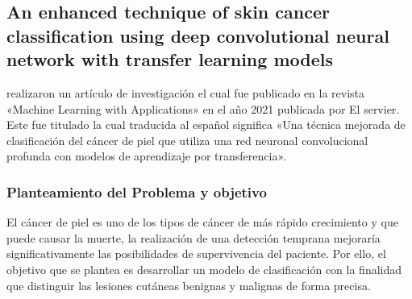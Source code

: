 \subsection{An enhanced technique of skin cancer classification using deep convolutional neural network with transfer learning models \citep*{ali_2021enhanced}}
\citeauthor{ali_2021enhanced} realizaron un artículo de investigación el cual fue publicado en la revista «Machine Learning with Applications» en el año 2021 publicada por El servier. Este fue titulado  la cual traducida al español significa «Una técnica mejorada de clasificación del cáncer de piel que utiliza una red neuronal convolucional profunda con modelos de aprendizaje por transferencia».

\subsubsection{Planteamiento del Problema y objetivo}
El cáncer de piel es uno de los tipos de cáncer de más rápido crecimiento y que puede causar la muerte, la realización de una detección temprana mejoraría significativamente las posibilidades de supervivencia del paciente. Por ello, el objetivo que se plantea es desarrollar un modelo de clasificación con la finalidad que distinguir las lesiones cutáneas benignas y malignas de forma precisa.


